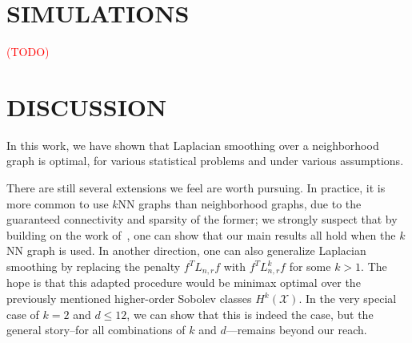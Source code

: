 \documentclass[twoside]{article}
\newcommand{\1}{\mathbf{1}}
\newcommand{\Lap}{L}
\newcommand{\Xset}{\mathcal{X}}
\theoremstyle{definition}
\theoremstyle{remark}
\begin{document}
\section{SIMULATIONS}
\label{sec:simulations}

\textcolor{red}{(TODO)}

\section{DISCUSSION}
\label{sec:discussion}

In this work, we have shown that Laplacian smoothing over a neighborhood graph is optimal, for various statistical problems and under various assumptions. 

There are still several extensions we feel are worth pursuing. In practice, it is more common to use $k$NN graphs than neighborhood graphs, due to the guaranteed connectivity and sparsity of the former; we strongly suspect that by building on the work of~\cite{calder2019}, one can show that our main results all hold when the $k$NN graph is used. In another direction, one can also generalize Laplacian smoothing by replacing the penalty $f^T \Lap_{n,r} f$ with $f^T \Lap_{n,r}^k f$ for some $k > 1$. The hope is that this adapted procedure would be minimax optimal over the previously mentioned higher-order Sobolev classes $H^k(\Xset)$. In the very special case of $k = 2$ and $d \leq 1 2$, we can show that this is indeed the case, but the general story--for all combinations of $k$ and $d$---remains beyond our reach. 


 
\end{document}
